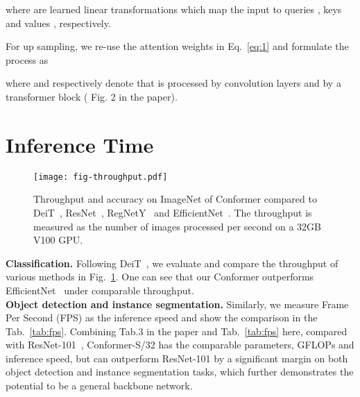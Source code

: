 \documentclass[10pt,twocolumn,letterpaper]{article}
\begin{document}
where  are learned linear transformations which map the input  to queries , keys  and values , respectively. 

For up sampling, we re-use the attention weights in Eq.~\ref{eq:1} and formulate the process as 

where  and  respectively denote that  is processed by convolution layers and  by a transformer block ( Fig. 2 in the paper).

\section{Inference Time}

\begin{figure}[t]
\begin{center}
\texttt{[image: fig-throughput.pdf]}
\end{center}
\vspace{-1em}
\caption{Throughput and accuracy on ImageNet of Conformer compared to DeiT~\cite{DeiT2020}, ResNet~\cite{ResNet2016}, RegNetY~\cite{RegNet2020} and EfficientNet~\cite{Efficientnet2019}. The throughput is measured as the number of images processed per second on a 32GB V100 GPU.
}
\label{fig:throughput}
\end{figure}


\noindent\textbf{Classification.} Following DeiT~\cite{DeiT2020}, we evaluate and compare the throughput of various methods in Fig.~\ref{fig:throughput}. One can see that our Conformer outperforms EfficientNet~\cite{Efficientnet2019} under comparable throughput.
~\\

\noindent\textbf{Object detection and instance segmentation.} 
Similarly, we measure Frame Per Second (FPS) as the inference speed and show the comparison in the Tab.~\ref{tab:fps}. 
Combining Tab.3 in the paper and Tab.~\ref{tab:fps} here, compared with ResNet-101~\cite{ResNet2016}, Conformer-S/32 has the comparable parameters, GFLOPs and inference speed, but can outperform ResNet-101 by a significant margin on both object detection and instance segmentation tasks, which further demonstrates the potential to be a general backbone network.
\end{document}
